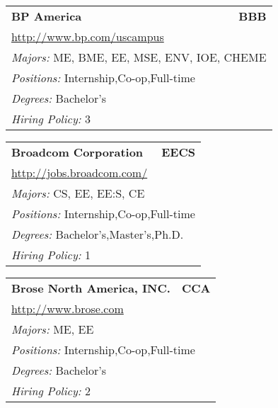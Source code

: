 \documentclass[twoside]{article}
\begin{document}
\begin{center}
\begin{multicols}{3}
\begin{FlushLeft}
\begin{minipage}{.9\columnwidth}
\end{minipage}
 
\begin{minipage}{.9\columnwidth}\begin{tabularx}{.95\columnwidth}{Xr}
                 {\Large\bf BP America} & {\Large\bf BBB}\\
    \multicolumn{2}{p{.95\columnwidth}}{\url{http://www.bp.com/uscampus}}\\
    \multicolumn{2}{p{.95\columnwidth}}{\emph{Majors:} ME, BME, EE, MSE, ENV, IOE, CHEME}\\
    \multicolumn{2}{p{.95\columnwidth}}{\emph{Positions:} Internship,Co-op,Full-time}\\
    \multicolumn{2}{p{.95\columnwidth}}{\emph{Degrees:} Bachelor's}\\
    \multicolumn{2}{p{.95\columnwidth}}{\emph{Hiring Policy:} 3}\\
    \end{tabularx}
    
\end{minipage}
 
\begin{minipage}{.9\columnwidth}\begin{tabularx}{.95\columnwidth}{Xr}
                 {\Large\bf Broadcom Corporation} & {\Large\bf EECS}\\
    \multicolumn{2}{p{.95\columnwidth}}{\url{http://jobs.broadcom.com/}}\\
    \multicolumn{2}{p{.95\columnwidth}}{\emph{Majors:} CS, EE, EE:S, CE}\\
    \multicolumn{2}{p{.95\columnwidth}}{\emph{Positions:} Internship,Co-op,Full-time}\\
    \multicolumn{2}{p{.95\columnwidth}}{\emph{Degrees:} Bachelor's,Master's,Ph.D.}\\
    \multicolumn{2}{p{.95\columnwidth}}{\emph{Hiring Policy:} 1}\\
    \end{tabularx}
    
\end{minipage}
 
\begin{minipage}{.9\columnwidth}\begin{tabularx}{.95\columnwidth}{Xr}
                 {\Large\bf Brose North America, INC.} & {\Large\bf CCA}\\
    \multicolumn{2}{p{.95\columnwidth}}{\url{http://www.brose.com}}\\
    \multicolumn{2}{p{.95\columnwidth}}{\emph{Majors:} ME, EE}\\
    \multicolumn{2}{p{.95\columnwidth}}{\emph{Positions:} Internship,Co-op,Full-time}\\
    \multicolumn{2}{p{.95\columnwidth}}{\emph{Degrees:} Bachelor's}\\
    \multicolumn{2}{p{.95\columnwidth}}{\emph{Hiring Policy:} 2}\\
    \end{tabularx}
    

\end{minipage}
\end{FlushLeft}
\end{multicols}
\end{center}
\end{document}
